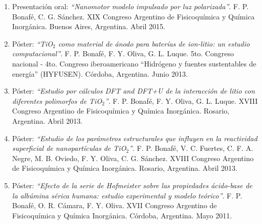 \documentclass[10pt]{article}
\begin{document}
\begin{enumerate}
 \item Presentación oral: {\it ``Nanomotor modelo impulsado por luz polarizada''}. F. P. Bonafé, C. G. Sánchez.
 XIX Congreso Argentino de Fisicoquímica y Química Inorgánica. Buenos Aires, Argentina. Abril 2015.
 \item Póster: {\it ``TiO$_2$ como material de ánodo para baterías de ion-litio: un estudio computacional''}. F. P. Bonafé, F. Y. Oliva, G. L. Luque.
 5to. Congreso nacional - 4to. Congreso iberoamericano ``Hidrógeno y fuentes sustentables de energía'' (HYFUSEN). Córdoba, Argentina. Junio 2013.
 \item Póster: {\it ``Estudio por cálculos DFT and DFT+U de la interacción de litio con diferentes polimorfos de TiO$_2$''}. F. P. Bonafé, F. Y. Oliva, G. L. Luque. 
 XVIII Congreso Argentino de Fisicoquímica y Química Inorgánica. Rosario, Argentina. Abril 2013.
 \item Póster: {\it ``Estudio de los parámetros estructurales que influyen en la reactividad superficial de nanopartículas de TiO$_2$''}. F. P. Bonafé, V. C. Fuertes, C. F. A. Negre, M. B. Oviedo, F. Y. Oliva, C. G. Sánchez.
 XVIII Congreso Argentino de Fisicoquímica y Química Inorgánica. Rosario, Argentina. Abril 2013.
 \item Póster: {\it ``Efecto de la serie de Hofmeister sobre las propiedades ácido-base de la albúmina sérica humana: estudio experimental y modelo teórico''}. F. P. Bonafé, O. R. Cámara, F. Y. Oliva.
 XVII Congreso Argentino de Fisicoquímica y Química Inorgánica. Córdoba, Argentina. Mayo 2011.
\end{enumerate}
\end{document}
